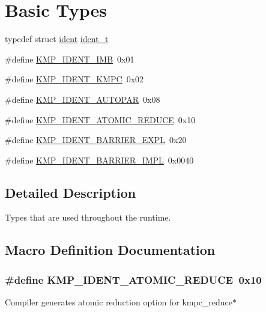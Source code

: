 \hypertarget{group__BASIC__TYPES}{\section{Basic Types}
\label{group__BASIC__TYPES}
}
\begin{DoxyCompactItemize}
\item 
typedef struct \hyperlink{structident}{ident} \hyperlink{group__BASIC__TYPES_ga690fda6b92f039a72db263c6b4394ddb}{ident\-\_\-t}
\item 
\#define \hyperlink{group__BASIC__TYPES_ga951d8a0a41a4b285b3da9cabd7a99f85}{K\-M\-P\-\_\-\-I\-D\-E\-N\-T\-\_\-\-I\-M\-B}~0x01
\item 
\#define \hyperlink{group__BASIC__TYPES_ga50e3ecb5eb8d70f437a84a8b2bc9e88f}{K\-M\-P\-\_\-\-I\-D\-E\-N\-T\-\_\-\-K\-M\-P\-C}~0x02
\item 
\#define \hyperlink{group__BASIC__TYPES_ga744ef043bd848d5e338b4c72ef247adc}{K\-M\-P\-\_\-\-I\-D\-E\-N\-T\-\_\-\-A\-U\-T\-O\-P\-A\-R}~0x08
\item 
\#define \hyperlink{group__BASIC__TYPES_gaf2f9e5d03f9f38651a3b8d5ef8635d44}{K\-M\-P\-\_\-\-I\-D\-E\-N\-T\-\_\-\-A\-T\-O\-M\-I\-C\-\_\-\-R\-E\-D\-U\-C\-E}~0x10
\item 
\#define \hyperlink{group__BASIC__TYPES_ga7358cc60d0f006b36752a1795e6d5d93}{K\-M\-P\-\_\-\-I\-D\-E\-N\-T\-\_\-\-B\-A\-R\-R\-I\-E\-R\-\_\-\-E\-X\-P\-L}~0x20
\item 
\#define \hyperlink{group__BASIC__TYPES_gaaffb56f3d5bd8803b41e9862e2aeb863}{K\-M\-P\-\_\-\-I\-D\-E\-N\-T\-\_\-\-B\-A\-R\-R\-I\-E\-R\-\_\-\-I\-M\-P\-L}~0x0040
\end{DoxyCompactItemize}


\subsection{Detailed Description}
Types that are used throughout the runtime. 

\subsection{Macro Definition Documentation}
\hypertarget{group__BASIC__TYPES_gaf2f9e5d03f9f38651a3b8d5ef8635d44}{
\subsubsection[{K\-M\-P\-\_\-\-I\-D\-E\-N\-T\-\_\-\-A\-T\-O\-M\-I\-C\-\_\-\-R\-E\-D\-U\-C\-E}]{\setlength{\rightskip}{0pt plus 5cm}\#define K\-M\-P\-\_\-\-I\-D\-E\-N\-T\-\_\-\-A\-T\-O\-M\-I\-C\-\_\-\-R\-E\-D\-U\-C\-E~0x10}}\label{group__BASIC__TYPES_gaf2f9e5d03f9f38651a3b8d5ef8635d44}
Compiler generates atomic reduction option for kmpc\-\_\-reduce$\ast$ 

